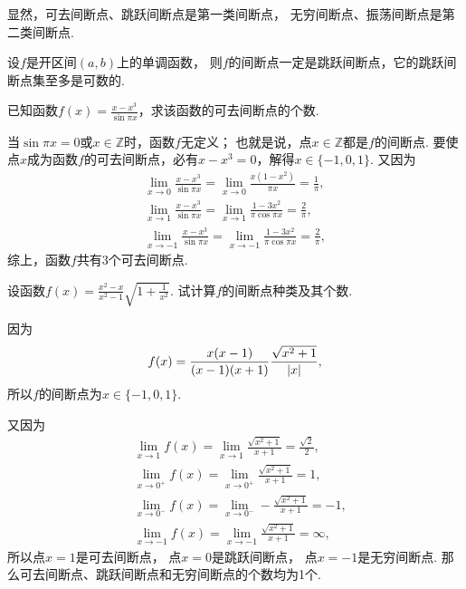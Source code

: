 显然，可去间断点、跳跃间断点是第一类间断点，
无穷间断点、振荡间断点是第二类间断点.

\begin{theorem}
设\(f\)是开区间\((a,b)\)上的单调函数，
则\(f\)的间断点一定是跳跃间断点，它的跳跃间断点集至多是可数的.
\end{theorem}

\begin{example}
已知函数\(f(x) = \frac{x-x^3}{\sin \pi x}\)，求该函数的可去间断点的个数.
\begin{solution}
当\(\sin \pi x = 0\)或\(x \in \mathbb{Z}\)时，函数\(f\)无定义；
也就是说，点\(x\in\mathbb{Z}\)都是\(f\)的间断点.
要使点\(x\)成为函数\(f\)的可去间断点，必有\(x-x^3=0\)，解得\(x\in\{-1,0,1\}\).
又因为\begin{gather*}
	\lim_{x\to0} \frac{x-x^3}{\sin \pi x}
	= \lim_{x\to0} \frac{x(1-x^2)}{\pi x}
	= \frac1\pi, \\
	\lim_{x\to1} \frac{x-x^3}{\sin \pi x}
	= \lim_{x\to1} \frac{1-3x^2}{\pi \cos \pi x}
	= \frac2\pi, \\
	\lim_{x\to-1} \frac{x-x^3}{\sin \pi x}
	= \lim_{x\to-1} \frac{1-3x^2}{\pi \cos \pi x}
	= \frac2\pi,
\end{gather*}
综上，函数\(f\)共有3个可去间断点.
\end{solution}
\end{example}

\begin{example}
设函数\(f(x) = \frac{x^2-x}{x^2-1}\sqrt{1+\frac{1}{x^2}}\).
试计算\(f\)的间断点种类及其个数.
\begin{solution}
因为\[
	f(x) = \frac{x(x-1)}{(x-1)(x+1)} \frac{\sqrt{x^2+1}}{\abs{x}},
\]
所以\(f\)的间断点为\(x\in\{-1,0,1\}\).

又因为\begin{align*}
	&\lim_{x\to1} f(x)
	= \lim_{x\to1} \frac{\sqrt{x^2+1}}{x+1}
	= \frac{\sqrt{2}}{2}, \\
	&\lim_{x\to0^+} f(x)
	= \lim_{x\to0^+} \frac{\sqrt{x^2+1}}{x+1}
	= 1, \\
	&\lim_{x\to0^-} f(x)
	= \lim_{x\to0^-} -\frac{\sqrt{x^2+1}}{x+1}
	= -1, \\
	&\lim_{x\to-1} f(x)
	= \lim_{x\to-1} \frac{\sqrt{x^2+1}}{x+1}
	= \infty,
\end{align*}
所以点\(x=1\)是可去间断点，
点\(x=0\)是跳跃间断点，
点\(x=-1\)是无穷间断点.
那么可去间断点、跳跃间断点和无穷间断点的个数均为1个.
\end{solution}
\end{example}

